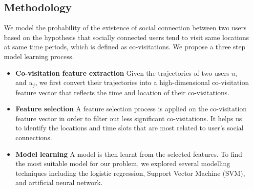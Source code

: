 \subsection{Methodology} \label{sec:method}

We model the probability of the existence of social connection between two users based on the hypothesis that socially connected users tend to visit same locations at same time periods, which is defined as co-visitations. We propose a three step model learning process.
\begin{itemize}
\item \textbf{Co-visitation feature extraction} Given the trajectories of two users $u_i$ and $u_j$, we first convert their trajectories into a high-dimensional co-visitation feature vector that reflects the time and location of their co-visitations.

\item \textbf{Feature selection} A feature selection process is applied on the co-visitation feature vector in order to filter out less significant co-visitations. It helps us to identify the locations and time slots that are most related to user's social connections. 

\item \textbf{Model learning} A model is then learnt from the selected features. To find the most suitable model for our problem, we explored several modelling techniques including the logistic regression, Support Vector Machine (SVM), and artificial neural network.
\end{itemize}


\iffalse

Research questions worth exploring in the future

1. Active user vs Non-active users?
2. Percentage of social connections can be explained by trajectories? 
3. Most significant types of locations?
4. Most significant time slots?
5. Geo-distance and predictive power?

\fi